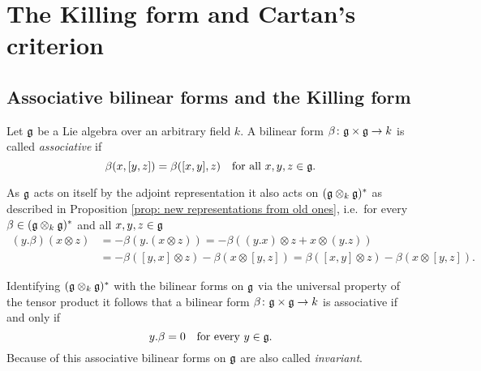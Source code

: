 \section{The Killing form and Cartan’s criterion}





\subsection{Associative bilinear forms and the Killing form}


\begin{defi}
 Let $\mathfrak{g}$ be a Lie algebra over an arbitrary field $k$. A bilinear form $\beta \colon \mathfrak{g} \times \mathfrak{g} \to k$ is called \emph{associative} if
 \[
  \beta(x,[y,z]) = \beta([x,y],z) \quad \text{for all $x,y,z \in \mathfrak{g}$}.
 \]
\end{defi}


\begin{rem}
 As $\mathfrak{g}$ acts on itself by the adjoint representation it also acts on $(\mathfrak{g} \otimes_k \mathfrak{g})^*$ as described in Proposition \ref{prop: new representations from old ones}, i.e.\ for every $\beta \in (\mathfrak{g} \otimes_k \mathfrak{g})^*$ and all $x,y,z \in \mathfrak{g}$
 \begin{align*}
  (y.\beta)(x \otimes z)
  &= -\beta(y.(x \otimes z))
  = -\beta((y.x) \otimes z + x \otimes (y.z)) \\
  &= -\beta([y,x] \otimes z) -\beta(x \otimes [y,z])
  = \beta([x,y] \otimes z) - \beta(x \otimes [y,z]).
 \end{align*}
 
 Identifying $(\mathfrak{g} \otimes_k \mathfrak{g})^*$ with the bilinear forms on $\mathfrak{g}$ via the universal property of the tensor product it follows that a bilinear form $\beta \colon \mathfrak{g} \times \mathfrak{g} \to k$ is associative if and only if
 \[
  y.\beta = 0 \quad \text{for every $y \in \mathfrak{g}$}.
 \]
 Because of this associative bilinear forms on $\mathfrak{g}$ are also called \emph{invariant}.
\end{rem}


